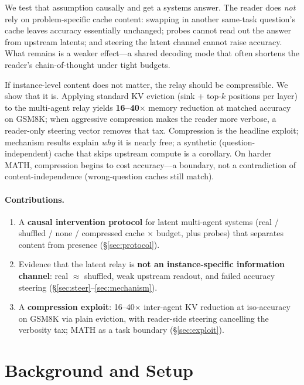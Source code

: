 \documentclass[11pt]{article}
\newcommand{\approxeqq}{\ensuremath{\approx}}
\begin{document}
We test that assumption causally and get a systems answer. The reader does
\emph{not} rely on problem-specific cache content: swapping in another
same-task question's cache leaves accuracy essentially unchanged; probes cannot
read out the answer from upstream latents; and steering the latent channel
cannot raise accuracy. What remains is a weaker effect---a shared decoding mode
that often shortens the reader's chain-of-thought under tight budgets.

If instance-level content does not matter, the relay should be compressible.
We show that it is. Applying standard KV eviction (sink + top-$k$ positions per
layer) to the multi-agent relay yields \textbf{16--40$\times$} memory reduction
at matched accuracy on GSM8K; when aggressive compression makes the reader more
verbose, a reader-only steering vector removes that tax. Compression is the
headline exploit; mechanism results explain \emph{why} it is nearly free; a
synthetic (question-independent) cache that skips upstream compute is a
corollary. On harder MATH, compression begins to cost accuracy---a boundary, not
a contradiction of content-independence (wrong-question caches still match).

\paragraph{Contributions.}
\begin{enumerate}\itemsep2pt
\item A \textbf{causal intervention protocol} for latent multi-agent systems
(real / shuffled / none / compressed cache $\times$ budget, plus probes) that
separates content from presence (\S\ref{sec:protocol}).
\item Evidence that the latent relay is \textbf{not an instance-specific
information channel}: real $\approxeqq$ shuffled, weak upstream readout, and
failed accuracy steering (\S\ref{sec:steer}--\ref{sec:mechanism}).
\item A \textbf{compression exploit}: 16--40$\times$ inter-agent KV reduction at
iso-accuracy on GSM8K via plain eviction, with reader-side steering cancelling
the verbosity tax; MATH as a task boundary (\S\ref{sec:exploit}).
\end{enumerate}

\section{Background and Setup}
\label{sec:bg}
\end{document}
